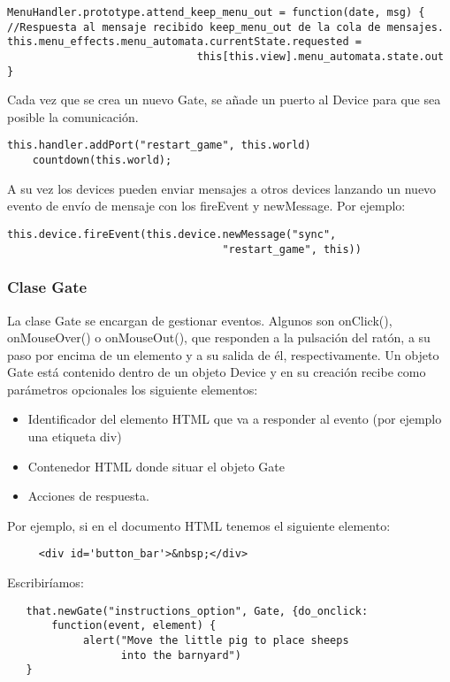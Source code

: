 \begin{verbatim}
MenuHandler.prototype.attend_keep_menu_out = function(date, msg) {
//Respuesta al mensaje recibido keep_menu_out de la cola de mensajes.
this.menu_effects.menu_automata.currentState.requested = 
                              this[this.view].menu_automata.state.out
}
\end{verbatim}

Cada vez que se crea un nuevo Gate, se añade un puerto al Device para que sea posible la comunicación.

\begin{verbatim}
this.handler.addPort("restart_game", this.world)
    countdown(this.world);
\end{verbatim}


A su vez los devices pueden enviar mensajes a otros devices lanzando un nuevo evento de envío de mensaje con los fireEvent y newMessage.
Por ejemplo:

\begin{verbatim}
this.device.fireEvent(this.device.newMessage("sync", 
                                  "restart_game", this))
\end{verbatim}


\subsubsection{Clase Gate}
\label{subsubsection:gate}
 
La clase Gate se encargan de gestionar eventos. Algunos son onClick(), onMouseOver() o onMouseOut(), que responden a la pulsación del ratón, a 
su paso por encima de un elemento y a su salida de él, respectivamente. 
Un objeto Gate está contenido dentro de un objeto Device y en su creación recibe como parámetros opcionales los siguiente elementos:

\begin{itemize}
 \item Identificador del elemento HTML que va a responder al evento (por ejemplo una etiqueta div) 
 \item Contenedor HTML donde situar el objeto Gate
 \item Acciones de respuesta.
\end{itemize}

Por ejemplo, si en el documento HTML tenemos el siguiente elemento:
\begin{verbatim}
     <div id='button_bar'>&nbsp;</div>
\end{verbatim}
Escribiríamos:
\begin{verbatim}
   that.newGate("instructions_option", Gate, {do_onclick: 
       function(event, element) {
            alert("Move the little pig to place sheeps 
                  into the barnyard")
   }
\end{verbatim}

